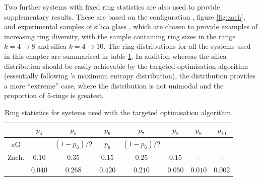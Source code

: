 Two further systems with fixed ring statistics are also used to provide supplementary results.
These are based on the \zach{} configuration \cite{Zachariasen1932}, figure \ref{fig:zach}, and experimental samples of silica glass \cite{Lichtenstein2012}, which are chosen to provide examples of increasing ring diversity, with the \zach{} sample containing ring sizes in the range $k=4\rightarrow 8$ and silica $k=4\rightarrow 10$. 
The ring distributions for all the systems used in this chapter are summarised in table \ref{tab:toptpk}.
In addition whereas the silica distribution should be easily achievable by the targeted optimisation algorithm (essentially following \lm's maximum entropy distribution), the \zach{} distribution provides a more ``extreme'' case, where the distribution is not unimodal and the proportion of $5$-rings is greatest.


\begin{table}[h]
	\centering
	\caption{Ring statistics for systems used with the targeted optimisation algorithm.}
	\label{tab:toptpk}
	\begin{tabular}{c c c c c c c c}
	\toprule
	& $p_4$ & $p_5$ & $p_6$ & $p_7$ & $p_8$ & $p_9$ & $p_{10}$ \\[0.5mm]
	\midrule
	aG &- & $\left(1-p_6\right)/2$ & $p_6$ & $\left(1-p_6\right)/2$ & - & - & -  \\	
	Zach. \cite{Zachariasen1932} & $0.10$ & $0.35$ & $0.15$ &  $0.25$ & $0.15$ & - & - \\	
	\sioii{} \cite{Lichtenstein2012} & $0.040$ & $0.268$ & $0.420$ & $0.210$ & $0.050$  & $0.010$ & $0.002$ \\
	\bottomrule	
	\end{tabular}
\end{table}

